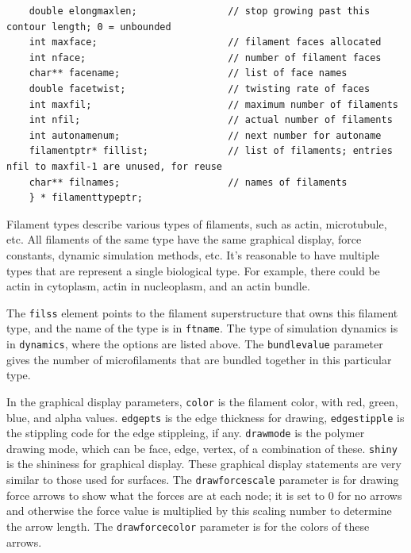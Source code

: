 \documentclass {scrbook}
\newcommand {\ttt} {\texttt}
\begin{document}
\begin{lstlisting}
    double elongmaxlen;                // stop growing past this contour length; 0 = unbounded
    int maxface;                       // filament faces allocated
    int nface;                         // number of filament faces
    char** facename;                   // list of face names
    double facetwist;                  // twisting rate of faces
    int maxfil;                        // maximum number of filaments
    int nfil;                          // actual number of filaments
    int autonamenum;                   // next number for autoname
    filamentptr* fillist;              // list of filaments; entries nfil to maxfil-1 are unused, for reuse
    char** filnames;                   // names of filaments
    } * filamenttypeptr;
\end{lstlisting}

Filament types describe various types of filaments, such as actin, microtubule, etc. All filaments of the same type have the same graphical display, force constants, dynamic simulation methods, etc. It's reasonable to have multiple types that are represent a single biological type. For example, there could be actin in cytoplasm, actin in nucleoplasm, and an actin bundle.

The \ttt{filss} element points to the filament superstructure that owns this filament type, and the name of the type is in \ttt{ftname}. The type of simulation dynamics is in \ttt{dynamics}, where the options are listed above. The \ttt{bundlevalue} parameter gives the number of microfilaments that are bundled together in this particular type.

In the graphical display parameters, \ttt{color} is the filament color, with red, green, blue, and alpha values. \ttt{edgepts} is the edge thickness for drawing, \ttt{edgestipple} is the stippling code for the edge stippleing, if any. \ttt{drawmode} is the polymer drawing mode, which can be face, edge, vertex, of a combination of these. \ttt{shiny} is the shininess for graphical display. These graphical display statements are very similar to those used for surfaces. The \ttt{drawforcescale} parameter is for drawing force arrows to show what the forces are at each node; it is set to 0 for no arrows and otherwise the force value is multiplied by this scaling number to determine the arrow length. The \ttt{drawforcecolor} parameter is for the colors of these arrows.
\end{document}
